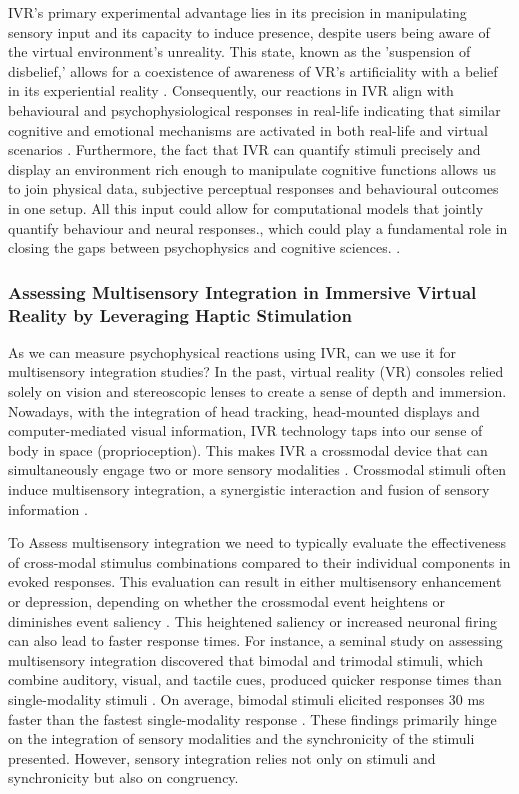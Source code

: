 \documentclass[12pt,oneside,openright]{report}
\begin{document}
IVR's primary experimental advantage lies in its precision in manipulating sensory input and its capacity to induce presence, despite users being aware of the virtual environment's unreality. This state, known as the 'suspension of disbelief,' allows for a coexistence of awareness of VR's artificiality with a belief in its experiential reality \parencite{Slater2009PlaceIA}. Consequently, our reactions in IVR align with behavioural and psychophysiological responses in real-life indicating that similar cognitive and emotional mechanisms are activated in both real-life and virtual scenarios \parencite{Vasser2020GuidelinesFI, deGelder2018VirtualRA}. Furthermore, the fact that IVR can quantify stimuli precisely and display an environment rich enough to manipulate cognitive functions allows us to join physical data, subjective perceptual responses and behavioural outcomes in one setup. All this input could allow for computational models that jointly quantify behaviour and neural responses., which could play a fundamental role in closing the gaps between psychophysics and cognitive sciences. \parencite{WASKOM2019100}. 


\subsubsection*{Assessing Multisensory Integration in Immersive Virtual Reality by Leveraging Haptic Stimulation}

As we can measure psychophysical reactions using IVR, can we use it for multisensory integration studies? In the past, virtual reality (VR) consoles relied solely on vision and stereoscopic lenses to create a sense of depth and immersion. Nowadays, with the integration of head tracking, head-mounted displays and computer-mediated visual information, IVR technology taps into our sense of body in space (proprioception). This makes IVR a crossmodal device that can simultaneously engage two or more sensory modalities \parencite{Marucci2021TheIO}. Crossmodal stimuli often induce multisensory integration, a synergistic interaction and fusion of sensory information \parencite{Stein2008MultisensoryIC}.

To Assess multisensory integration we need to typically evaluate the effectiveness of cross-modal stimulus combinations compared to their individual components in evoked responses. This evaluation can result in either multisensory enhancement or depression, depending on whether the crossmodal event heightens or diminishes event saliency \parencite{Stein2008MultisensoryIC}. This heightened saliency or increased neuronal firing can also lead to faster response times. For instance, a seminal study on assessing multisensory integration discovered that bimodal and trimodal stimuli, which combine auditory, visual, and tactile cues, produced quicker response times than single-modality stimuli \parencite{Diederich2004BimodalAT}. On average, bimodal stimuli elicited responses 30 ms faster than the fastest single-modality response \parencite{Diederich2004BimodalAT}. These findings primarily hinge on the integration of sensory modalities and the synchronicity of the stimuli presented. However, sensory integration relies not only on stimuli and synchronicity but also on congruency.
\end{document}
